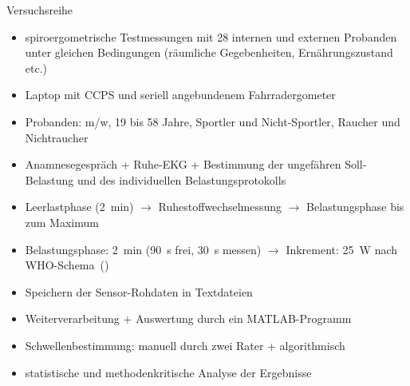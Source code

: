 \documentclass[colorBG,slideColor,8pt]{beamer}
\begin{document}
\begin{frame}{Versuchsreihe}
\begin{itemize}
	\item spiroergometrische Testmessungen mit 28 internen und externen Probanden unter gleichen Bedingungen (räumliche Gegebenheiten, Ernährungszustand etc.)
	\item Laptop mit CCPS und seriell angebundenem Fahrradergometer
	\item Probanden: m/w, 19 bis 58 Jahre, Sportler und Nicht-Sportler, Raucher und Nichtraucher
	\item Anamnesegespräch + Ruhe-EKG + Bestimmung der ungefähren Soll-Belastung und des individuellen Belastungsprotokolls
	\item Leerlastphase (\SI{2}{\minute}) $\rightarrow$ Ruhestoffwechselmessung $\rightarrow$ Belastungsphase bis zum Maximum
	\item Belastungsphase: \SI{2}{\minute} (\SI{90}{\second} frei, \SI{30}{\second} messen) $\rightarrow$ Inkrement: \SI{25}{\watt} nach WHO-Schema~(\cite{Trappe.2000})
	\item Speichern der Sensor-Rohdaten in Textdateien
	\item Weiterverarbeitung + Auswertung durch ein MATLAB-Programm
	\item Schwellenbestimmung: manuell durch zwei Rater + algorithmisch
	\item statistische und methodenkritische Analyse der Ergebnisse
\end{itemize}
\end{frame}
\end{document}
